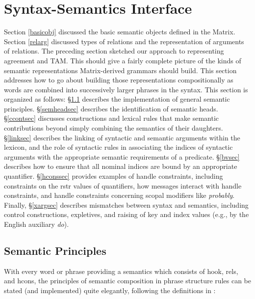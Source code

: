 \documentclass[12pt]{article}
\begin{document}
\section{Syntax-Semantics Interface}
\label{synsem-i}

Section \ref{basicobj} discussed the basic semantic objects defined
in the Matrix.  Section \ref{relarg} discussed types of relations
and the representation of arguments of relations.  The preceding
section sketched our approach to representing agreement and TAM.
This should give a fairly complete picture of the kinds of semantic
representations Matrix-derived grammars should build.  This section
addresses how to go about building those representations
compositionally as words are combined into successively larger phrases
in the syntax.  This section is organized as follows:
\S\ref{semprinsec} describes the implementation of general semantic
principles. \S\ref{semheadsec} describes the identification of
semantic heads.  \S\ref{ccontsec} discusses constructions and lexical
rules that make semantic contributions beyond simply combining the
semantics of their daughters.  \S\ref{linksec} describes the linking
of syntactic and semantic arguments within the lexicon, and the
role of syntactic rules in associating the indices of syntactic
arguments with the appropriate semantic requirements of a predicate.
\S\ref{bvsec} describes how to ensure that all nominal indices are
bound by an appropriate quantifier.  \S\ref{hconssec} provides
examples of handle constraints, including constraints on the {\sc
rstr} values of quantifiers, how messages interact with handle
constraints, and handle constraints concerning scopal modifiers like
{\it probably}.  
Finally, \S\ref{xargsec} describes mismatches between syntax and
semantics, including control constructions, expletives, and
raising of {\sc key} and {\sc index} values (e.g., by the English auxiliary 
{\it do}).

\subsection{Semantic Principles}
\label{semprinsec}

With every word or phrase providing a semantics which consists of {\sc
hook}, {\sc rels}, and {\sc hcons}, the principles of semantic
composition in phrase structure rules can be stated (and implemented)
quite elegantly, following the definitions in :
\end{document}

